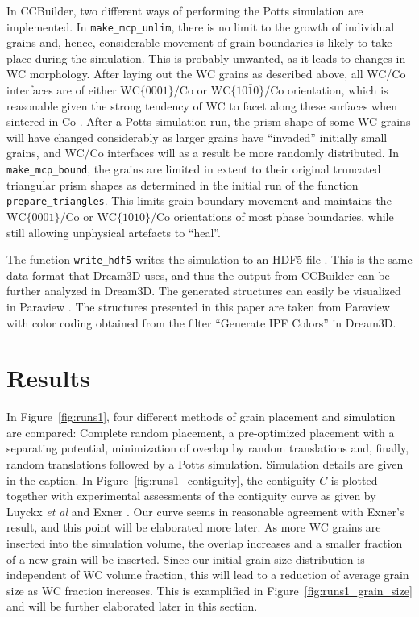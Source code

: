 \documentclass[10pt,a4paper]{article}
\begin{document}
In CCBuilder, two different ways of performing the Potts simulation are implemented. In \verb|make_mcp_unlim|, there is no limit to the growth of individual grains and, hence, considerable movement of grain boundaries is likely to take place during the simulation. This is probably unwanted, as it leads to changes in WC morphology.  After laying out the WC grains as described above, all WC/Co interfaces are of either $\text{WC}\{0001\}/\text{Co}$ or $\text{WC}\{10\bar{1}0\}/\text{Co}$ orientation, which is reasonable given the strong tendency of WC to facet along these surfaces when sintered in Co \cite{KiMaRo08}. After a Potts simulation run, the prism shape of some WC grains will have changed considerably as larger grains have ``invaded'' initially small grains, and WC/Co interfaces will as a result be more randomly distributed. In \verb|make_mcp_bound|, the grains are limited in extent to their original truncated triangular prism shapes as determined in the initial run of the function \verb|prepare_triangles|. This limits grain boundary movement and maintains the $\text{WC}\{0001\}/\text{Co}$ or $\text{WC}\{10\bar{1}0\}/\text{Co}$ orientations of most phase boundaries, while still allowing unphysical artefacts to ``heal''.

The function \verb|write_hdf5| writes the simulation to an HDF5 file \cite{h5py}. This is the same data format that Dream3D uses, and thus the output from CCBuilder can be further analyzed in Dream3D. The generated structures can easily be visualized in Paraview \cite{Paraview}. The structures presented in this paper are taken from Paraview with color coding obtained from the filter ``Generate IPF Colors'' in Dream3D.

\section{Results}
\label{sec:results}
In Figure~\ref{fig:runs1}, four different methods of grain placement and simulation are compared: Complete random placement, a pre-optimized placement with a separating potential, minimization of overlap by random translations and, finally, random translations followed by a Potts simulation. Simulation details are given in the caption. In Figure~\ref{fig:runs1_contiguity}, the contiguity $C$ is plotted together with experimental assessments of the contiguity curve as given by Luyckx \textit{et al} \cite{LuLo06} and Exner \cite{Ex79}. Our curve seems in reasonable agreement with Exner's result, and this point will be elaborated more later. As more WC grains are inserted into the simulation volume, the overlap increases and a smaller fraction of a new grain will be inserted. Since our initial grain size distribution is independent of WC volume fraction, this will lead to a reduction of average grain size as WC fraction increases. This is examplified in Figure~\ref{fig:runs1_grain_size} and will be further elaborated later in this section.
\end{document}
